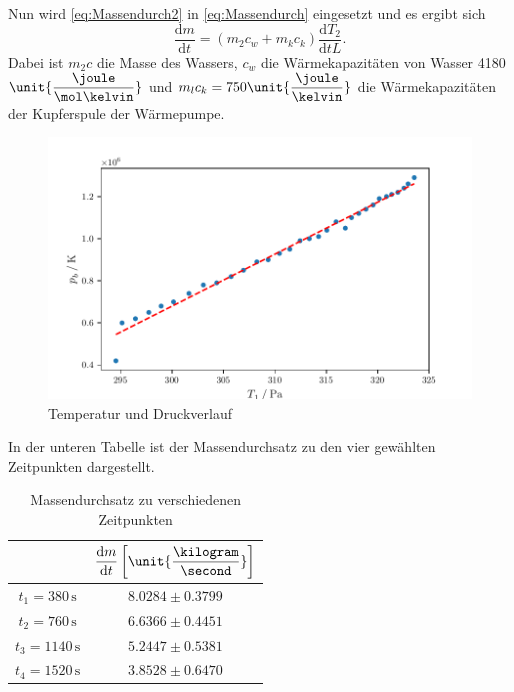 Nun wird \eqref{eq:Massendurch2} in \eqref{eq:Massendurch} eingesetzt und es ergibt sich
\begin{equation}
  \dfrac{\text{d}m}{\text{d}t} = (m_2c_w +m_kc_k)\dfrac{\text{d}T_2}{\text{d}tL}.
\end{equation}
Dabei ist $m_2c$ die Masse des Wassers, $c_w$ die Wärmekapazitäten von Wasser 4180 $\unit{\dfrac{\joule}{\mol\kelvin}}$ und $m_l c_k = 750 \unit{\dfrac{\joule}{\kelvin}}$ die Wärmekapazitäten der Kupferspule der Wärmepumpe.

\begin{figure}[H]
  \centering
  \includegraphics{Test.pdf}
  \caption{Temperatur und Druckverlauf}
  \label{fig:plot3}
\end{figure}



In der unteren Tabelle ist der Massendurchsatz zu den vier gewählten Zeitpunkten dargestellt.
\begin{table}[H]
  \label{tab:massendurch3}
  \centering
  \begin{tabular}{S S}
    \toprule
    & {$\dfrac{\text{d}m}{\text{d}t}  \left[\unit{\dfrac{\kilogram}{\second}}\right]$}  \\
    \midrule
    {$t_1 = 380  \, \unit{\second}$} & {$8.0284 \pm 0.3799$}  \\
    {$t_2 = 760  \, \unit{\second}$} & {$6.6366 \pm 0.4451$}  \\
    {$t_3 = 1140 \, \unit{\second}$} & {$5.2447 \pm 0.5381$}  \\
    {$t_4 = 1520 \, \unit{\second}$} & {$3.8528 \pm 0.6470$}  \\
    \bottomrule
  \end{tabular}
  \caption{Massendurchsatz zu verschiedenen Zeitpunkten}
\end{table}

